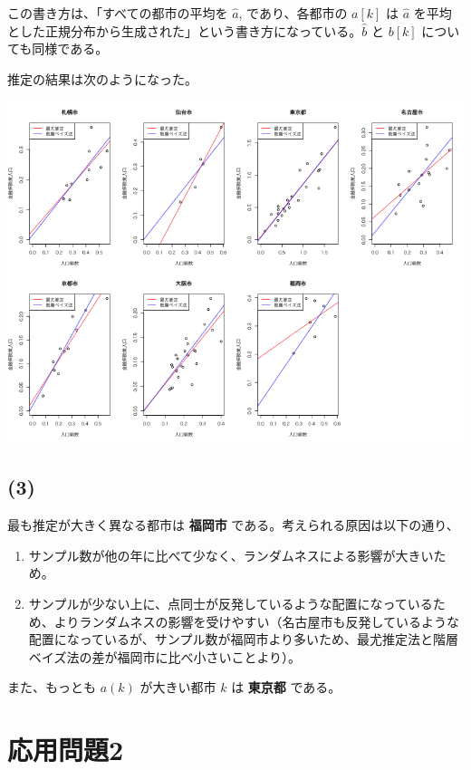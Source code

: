 \documentclass[a4paper,xelatex,ja=standard,jafont=hiragino-pron, 9pt]{bxjsarticle}
\let\origfigure=\figure
\let\endorigfigure=\endfigure
\renewenvironment{figure}[1][]{%
  \origfigure[H]
}{%
  \endorigfigure
}
\def\tightlist{\itemsep1pt\parskip0pt\parsep0pt}
\begin{document}
この書き方は、「すべての都市の平均を \(\hat{a}\), であり、各都市の
\(a[k]\) は \(\hat{a}\)
を平均とした正規分布から生成された」という書き方になっている。\(\hat{b}\)
と \(b[k]\) についても同様である。

推定の結果は次のようになった。

\begin{figure}
\centering
\includegraphics[width=14.00000cm]{../src/output/image/mle-mcmc.png}
\caption{階層ベイズ法と最尤推定法の比較}
\end{figure}

\subsection*{(3)}

最も推定が大きく異なる都市は \textbf{福岡市}
である。考えられる原因は以下の通り、

\begin{enumerate}
\def\labelenumi{\arabic{enumi}.}
\tightlist
\item
  サンプル数が他の年に比べて少なく、ランダムネスによる影響が大きいため。
\item
  サンプルが少ない上に、点同士が反発しているような配置になっているため、よりランダムネスの影響を受けやすい（名古屋市も反発しているような配置になっているが、サンプル数が福岡市より多いため、最尤推定法と階層ベイズ法の差が福岡市に比べ小さいことより）。
\end{enumerate}

また、もっとも \(a(k)\) が大きい都市 \(k\) は \textbf{東京都} である。

\section*{応用問題2}
\end{document}
